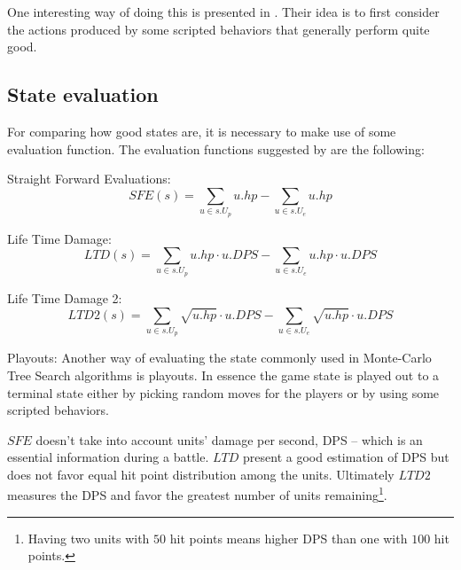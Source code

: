 One interesting way of doing this is presented in \cite{portfolio}.
Their idea is to first consider the actions produced by some scripted behaviors that generally perform quite good.



\subsection{State evaluation}
For comparing how good states are, it is necessary to make use of some evaluation function.
The evaluation functions suggested by \cite{abcd} are the following:
\begin{shortitem}
\item Straight Forward Evaluations:
$$
    \displaystyle{SFE(s) = \sum_{u \in s.U_p} u.hp - \sum_{u \in s.U_e} u.hp } 
$$

\item Life Time Damage:
$$
    \displaystyle{LTD(s) = \sum_{u \in s.U_p} u.hp \cdot u.DPS- \sum_{u \in s.U_e} u.hp \cdot u.DPS } 
$$

\item Life Time Damage 2:
$$
    \displaystyle{LTD2(s) = \sum_{u \in s.U_p} \sqrt{u.hp} \cdot u.DPS - \sum_{u \in s.U_e} \sqrt{u.hp} \cdot u.DPS } 
$$

\item Playouts:
	Another way of evaluating the state commonly used in Monte-Carlo Tree Search algorithms is playouts. In essence the game state is played out to a terminal state either by picking random moves for the players or by using some scripted behaviors.
\end{shortitem}


$SFE$ doesn't take into account units' damage per second, DPS -- which is an essential information during a battle. 
$LTD$ present a good estimation of DPS but does not favor equal hit point distribution among the units. 
Ultimately $LTD2$ measures the DPS and favor the greatest number of units remaining\footnote{Having two units with $50$ hit points means higher DPS than one with $100$ hit points.}.




